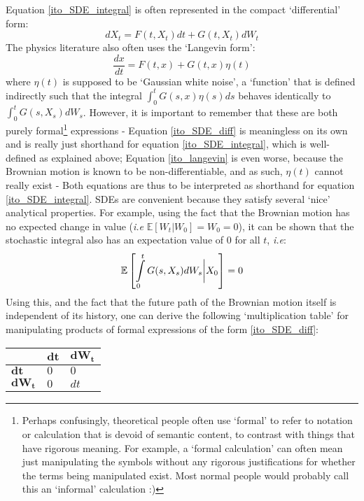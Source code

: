 Equation \eqref{ito_SDE_integral} is often represented in the compact `differential' form:
\begin{equation}
\label{ito_SDE_diff}
dX_t = F(t,X_t)dt + G(t,X_t)dW_t
\end{equation}
The physics literature also often uses the `Langevin form':
\begin{equation}
\label{ito_langevin}
\frac{dx}{dt} = F(t,x) + G(t,x)\eta(t)
\end{equation}
where $\eta(t)$ is supposed to be `Gaussian white noise', a `function' that is defined indirectly such that the integral $\int_0^{t}G(s,x)\eta(s)ds$ behaves identically to $\int_0^{t}G(s,X_s)dW_s$. However, it is important to remember that these are both purely formal\footnote{Perhaps confusingly, theoretical people often use `formal' to refer to notation or calculation that is devoid of semantic content, to contrast with things that have rigorous meaning. For example, a `formal calculation' can often mean just manipulating the symbols without any rigorous justifications for whether the terms being manipulated exist. Most normal people would probably call this an `informal' calculation :)} expressions - Equation \eqref{ito_SDE_diff} is meaningless on its own and is really just shorthand for equation \eqref{ito_SDE_integral}, which is well-defined as explained above; Equation \eqref{ito_langevin} is even worse, because the Brownian motion is known to be non-differentiable, and as such, $\eta(t)$ cannot really exist - Both equations are thus to be interpreted as shorthand for equation \eqref{ito_SDE_integral}. SDEs are convenient because they satisfy several `nice' analytical properties. For example, using the fact that the Brownian motion has no expected change in value (\emph{i.e} $\mathbb{E}[W_t | W_0] = W_0 = 0$), it can be shown that the stochastic integral also has an expectation value of $0$ for all $t$, \emph{i.e}:
\begin{equation*}
\mathbb{E}\left[\int\limits_{0}^{t} G(s,X_s)dW_s \bigg{|} X_0\right] = 0
\end{equation*}
Using this, and the fact that the future path of the Brownian motion itself is independent of its history, one can derive the following `multiplication table' for manipulating products of formal expressions of the form \eqref{ito_SDE_diff}:
\begin{center}
	\begin{tabularx}{0.4\textwidth}{ 
			| >{\centering\arraybackslash}X 
			| >{\centering\arraybackslash}X 
			| >{\centering\arraybackslash}X | }
		\hline
		& $\mathbf{dt}$ & $\mathbf{dW_t}$ \\
		\hline
		$\mathbf{dt}$ & $0$  &  $0$ \\ 
		\hline
		$\mathbf{dW_t}$ & $0$  & $dt$ \\
		\hline
	\end{tabularx}
\end{center}
